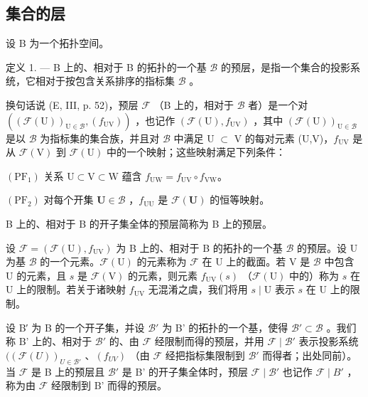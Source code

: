 \subsection{集合的层}

设 B 为一个拓扑空间。

定义 1. --- B 上的、相对于 B 的拓扑的一个基 \(\mathcal{B}\) 的预层，是指一个集合的投影系统，它相对于按包含关系排序的指标集 \(\mathcal{B}\) 。

换句话说 (E, III, p. 52)，预层 \(\mathcal{F}\) （B 上的，相对于 \(\mathcal{B}\) 者）是一个对 \(((\mathcal{F}(\mathrm{U}))_{\mathrm{U}\in\mathcal{B}},(f_{\mathrm{UV}}))\) ，也记作 \((\mathcal{F}(\mathrm{U}),f_{\mathrm{UV}})\) ，其中 \((\mathcal{F}(\mathrm{U}))_{\mathrm{U}\in\mathcal{B}}\) 是以 \(\mathcal{B}\) 为指标集的集合族，并且对 \(\mathcal{B}\) 中满足 U \(\subset\) V 的每对元素 (U,V)，\(f_{\mathrm{UV}}\) 是从 \(\mathcal{F}(\mathrm{V})\) 到 \(\mathcal{F}(\mathrm{U})\) 中的一个映射；这些映射满足下列条件：

\((\mathrm{PF}_{1})\) 关系 \(\mathrm{U}\subset \mathrm{V}\subset \mathrm{W}\) 蕴含 \(f_{\mathrm{UW}} = f_{\mathrm{UV}}\circ f_{\mathrm{VW}}\)。

\((\mathrm{PF}_2)\) 对每个开集 \(\mathbf{U} \in \mathcal{B}\) ，\(f_{\mathrm{UU}}\) 是 \(\mathcal{F}(\mathbf{U})\) 的恒等映射。

B 上的、相对于 B 的开子集全体的预层简称为 B 上的预层。

设 \(\mathcal{F} = (\mathcal{F}(\mathrm{U}), f_{\mathrm{UV}})\) 为 B 上的、相对于 B 的拓扑的一个基 \(\mathcal{B}\) 的预层。设 U 为基 \(\mathcal{B}\) 的一个元素。\(\mathcal{F}(\mathrm{U})\) 的元素称为 \(\mathcal{F}\) 在 U 上的截面。若 V 是 \(\mathcal{B}\) 中包含 U 的元素，且 \(s\) 是 \(\mathcal{F}(\mathrm{V})\) 的元素，则元素 \(f_{\mathrm{UV}}(s)\) （\(\mathcal{F}(\mathrm{U})\) 中的）称为 \(s\) 在 U 上的限制。若关于诸映射 \(f_{\mathrm{UV}}\) 无混淆之虞，我们将用 \(s \mid \mathrm{U}\) 表示 \(s\) 在 U 上的限制。

设 B′ 为 B 的一个开子集，并设 \(\mathcal{B}'\) 为 B' 的拓扑的一个基，使得 \(\mathcal{B}' \subset \mathcal{B}\) 。我们称 B' 上的、相对于 \(\mathcal{B}'\) 的、由 \(\mathcal{F}\) 经限制而得的预层，并用 \(\mathcal{F} \mid \mathcal{B}'\) 表示投影系统 \(((\mathcal{F}(U))_{U \in \mathcal{B}'}\) 、\((f_{UV})\) （由 \(\mathcal{F}\) 经把指标集限制到 \(\mathcal{B}'\) 而得者；出处同前）。当 \(\mathcal{F}\) 是 B 上的预层且 \(\mathcal{B}'\) 是 B' 的开子集全体时，预层 \(\mathcal{F} \mid \mathcal{B}'\) 也记作 \(\mathcal{F} \mid B'\) ，称为由 \(\mathcal{F}\) 经限制到 B' 而得的预层。


